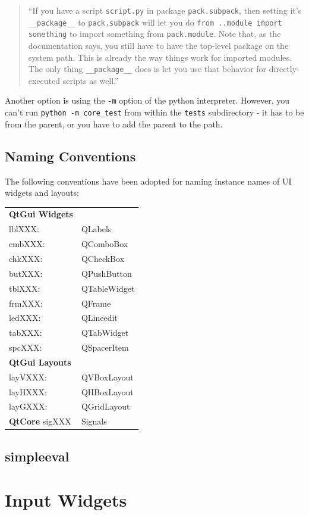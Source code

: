 \documentclass[paper=a4, pagesize, twoside, draft=false,
BCOR7mm, DIV13, fontsize=11pt, headings=normal, footinclude=false, 
toc=listof, english, parskip=half]{scrartcl} %
\begin{document}
\begin{quotation}
"`If you have a script \verb|script.py| in package \verb|pack.subpack|, then setting it's \verb|__package__| to \verb|pack.subpack| will let you do \verb|from ..module import something| to import something from \verb|pack.module|. Note that, as the documentation says, you still have to have the top-level package on the system path. This is already the way things work for imported modules. The only thing \verb|__package__| does is let you use that behavior for directly-executed scripts as well."'
\end{quotation}

Another option is using the \verb|-m| option of the python interpreter. However, you can't run \verb|python -m core_test| from within the \verb|tests| subdirectory - it has to be from the parent, or you have to add the parent to the path. 
	

\subsection{Naming Conventions}
The following conventions have been adopted for naming instance names of UI widgets and layouts:\\
\begin{tabular}{ll}
\textbf{QtGui Widgets}\\
lblXXX: &QLabels\\
cmbXXX: &QComboBox\\
chkXXX: &QCheckBox\\
butXXX: &QPushButton\\
tblXXX: &QTableWidget\\
frmXXX:	&QFrame\\
ledXXX:	&QLineedit\\
tabXXX:	&QTabWidget\\
spcXXX:	&QSpacerItem\\
\textbf{QtGui Layouts}\\
layVXXX: &QVBoxLayout\\
layHXXX: &QHBoxLayout\\
layGXXX: &QGridLayout\\
\textbf{QtCore}
sigXXX &Signals\\
\end{tabular}

\subsection{simpleeval}

\section{Input Widgets}
\end{document}
